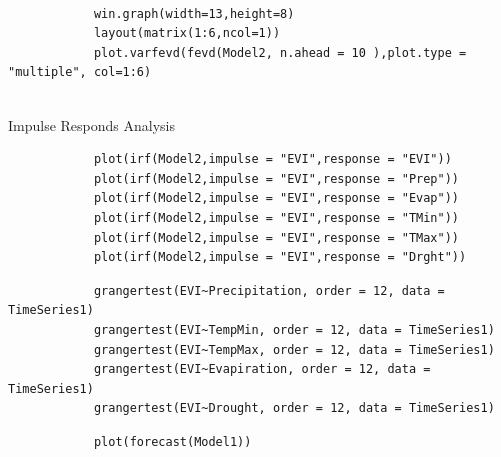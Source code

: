 \documentclass[12pt,a4paper]{book}
\begin{document}
			\begin{shaded}
				\begin{verbatim}
			
			win.graph(width=13,height=8)
			layout(matrix(1:6,ncol=1))
			plot.varfevd(fevd(Model2, n.ahead = 10 ),plot.type = "multiple", col=1:6)
			
				\end{verbatim}
		\end{shaded}
			 Impulse Responds Analysis
				\begin{shaded}
				\begin{verbatim}
			plot(irf(Model2,impulse = "EVI",response = "EVI"))
			plot(irf(Model2,impulse = "EVI",response = "Prep"))
			plot(irf(Model2,impulse = "EVI",response = "Evap"))
			plot(irf(Model2,impulse = "EVI",response = "TMin"))
			plot(irf(Model2,impulse = "EVI",response = "TMax"))
			plot(irf(Model2,impulse = "EVI",response = "Drght"))
			\end{verbatim}
	    \end{shaded}	
		\begin{shaded}
				\begin{verbatim}
			grangertest(EVI~Precipitation, order = 12, data = TimeSeries1)
			grangertest(EVI~TempMin, order = 12, data = TimeSeries1)
			grangertest(EVI~TempMax, order = 12, data = TimeSeries1)
			grangertest(EVI~Evapiration, order = 12, data = TimeSeries1)
			grangertest(EVI~Drought, order = 12, data = TimeSeries1)
				\end{verbatim}
		\end{shaded}
	
		\begin{shaded}
				\begin{verbatim}
			plot(forecast(Model1))
				\end{verbatim}
		\end{shaded}
			
	
\end{document}
